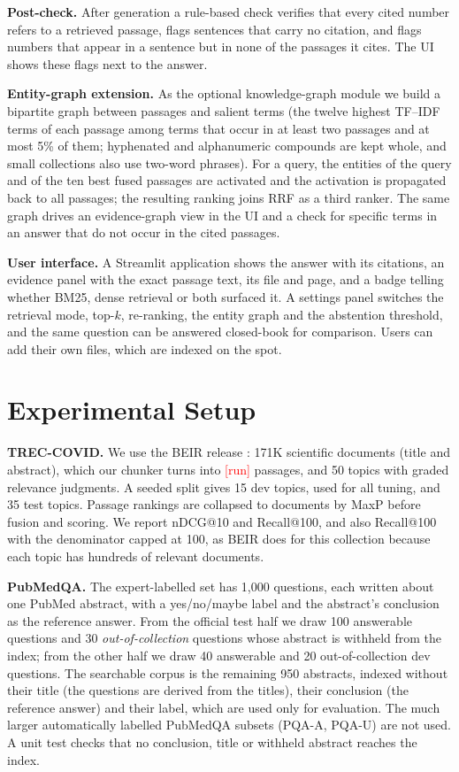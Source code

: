 \documentclass[11pt]{article}
\newcommand{\pending}{\textcolor{red}{[run]}}
\providecommand{\TrecDocs}{171K}\providecommand{\TrecPassages}{\pending}
\providecommand{\TrecDev}{15}\providecommand{\TrecTest}{35}
\providecommand{\PubDocs}{950}\providecommand{\PubAnswerable}{100}\providecommand{\PubOut}{30}\providecommand{\TopK}{\pending}
\begin{document}
\textbf{Post-check.} After generation a rule-based check verifies that every cited number
refers to a retrieved passage, flags sentences that carry no citation, and flags numbers that
appear in a sentence but in none of the passages it cites. The UI shows these flags next to
the answer.

\textbf{Entity-graph extension.} As the optional knowledge-graph module we build a bipartite
graph between passages and salient terms (the twelve highest TF--IDF terms of each passage
among terms that occur in at least two passages and at most 5\% of them; hyphenated and
alphanumeric compounds are kept whole, and small collections also use two-word phrases).
For a query, the entities of the query and of the ten best fused passages are activated and
the activation is propagated back to all passages; the resulting ranking joins RRF as a third
ranker. The same graph drives an evidence-graph view in the UI and a check for specific terms
in an answer that do not occur in the cited passages.

\textbf{User interface.} A Streamlit application shows the answer with its citations, an
evidence panel with the exact passage text, its file and page, and a badge telling whether
BM25, dense retrieval or both surfaced it. A settings panel switches the retrieval mode,
top-$k$, re-ranking, the entity graph and the abstention threshold, and the same question can
be answered closed-book for comparison. Users can add their own files, which are indexed on
the spot.

\section{Experimental Setup}

\textbf{TREC-COVID.} We use the BEIR release \citep{voorhees2021treccovid,thakur2021beir}:
\TrecDocs{} scientific documents (title and abstract), which our chunker turns into
\TrecPassages{} passages, and 50 topics with graded relevance judgments. A seeded split
gives \TrecDev{} dev topics, used for all tuning, and \TrecTest{} test topics. Passage
rankings are collapsed to documents by MaxP before fusion and scoring. We report nDCG@10 and
Recall@100, and also Recall@100 with the denominator capped at 100, as BEIR does for this
collection because each topic has hundreds of relevant documents.

\textbf{PubMedQA.} The expert-labelled set \citep{jin2019pubmedqa} has 1,000 questions, each
written about one PubMed abstract, with a yes/no/maybe label and the abstract's conclusion as
the reference answer. From the official test half we draw \PubAnswerable{} answerable
questions and \PubOut{} \emph{out-of-collection} questions whose abstract is withheld from the
index; from the other half we draw 40 answerable and 20 out-of-collection dev questions. The
searchable corpus is the remaining \PubDocs{} abstracts, indexed without their title (the
questions are derived from the titles), their conclusion (the reference answer) and their
label, which are used only for evaluation. The much larger automatically labelled PubMedQA
subsets (PQA-A, PQA-U) are not used. A unit test checks that no conclusion, title or withheld
abstract reaches the index.
\end{document}

